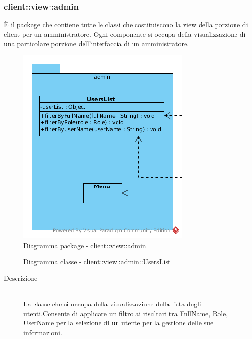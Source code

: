 \vspace{0.5cm}
\subsubsection{client::view::admin}
È il package che contiene tutte le classi che costituiscono la view della porzione di client per un amministratore. Ogni componente si occupa della visualizzazione di una particolare porzione dell'interfaccia di un amministratore.\begin{center}
	\begin{figure}[H]
		\centering \includegraphics[scale=4, max width=\textwidth, max height=\myheight]{../img/diagrammiClassi/client/view/admin.png}
		\caption{Diagramma package - client::view::admin}
	\end{figure}
\end{center}\hypertarget{client::view::admin::UsersList}{}
\begin{figure}[H]
	\centering
	\caption{Diagramma classe - client::view::admin::UsersList}
\end{figure}\begin{description}
\item[Descrizione] \hfill \\
La classe che si occupa della visualizzazione della lista degli utenti.Consente di applicare un filtro ai risultari tra FullName, Role, UserName per la selezione di un utente per la gestione delle sue informazioni.
\end{description}

